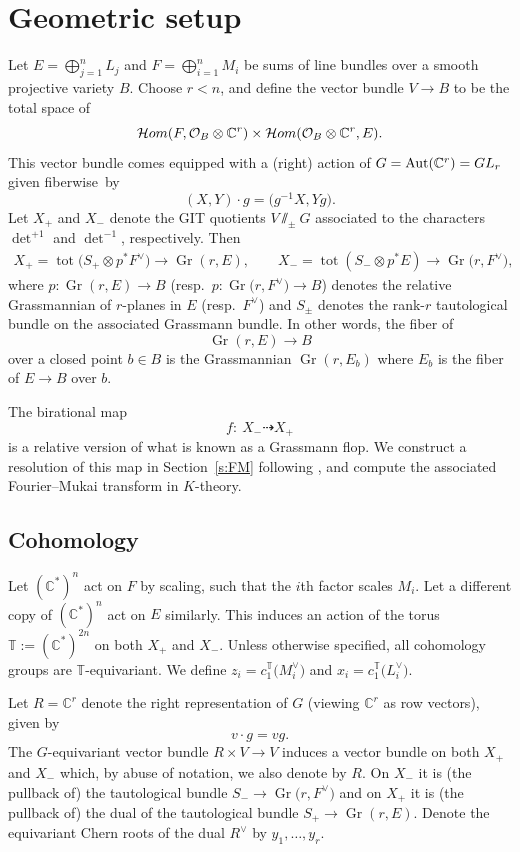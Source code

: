\documentclass[11pt]{article}
\numberwithin{equation}{section}
\numberwithin{equation}{section}
\newcommand{\cc}[1]{\mathcal{#1}} %
\newcommand{\CC}{\mathbb{C}}
\newcommand{\torus}{\mathbb{T}}
\DeclareMathOperator{\tot}{tot}
\DeclareMathOperator{\Gr}{Gr}
\newcommand{\op}[1]{\operatorname{#1}}
\newcommand{\F}{F}
\newcommand{\E}{E}
\newcommand{\MB}{M}
\newcommand{\LB}{L}
\newcommand{\z}{z}
\newcommand{\x}{x}
\newcommand{\y}{y}
\begin{document}
\section{Geometric setup}\label{gs}
Let $\E = \bigoplus_{j=1}^n \LB_j$ and $\F = \bigoplus_{i=1}^n \MB_i$ be sums of line bundles over a smooth projective variety $B$. Choose $r < n$, and define the vector bundle $V \to B$ to be the total space of
\[
\mathcal{H}{\rm om}(\F, \cc O_B \otimes \CC^r) \times \mathcal{H}{\rm om}(\cc O_B \otimes \CC^r, \E).
\]
This vector bundle comes equipped with a (right) action of $G = \op{Aut}(\CC^r) = {\rm GL}_r$ given fiberwise~by
\[
(X, Y)\cdot g = \bigl( g^{-1}X, Yg\bigr).
\]
Let $X_+$ and $X_-$ denote the GIT quotients $V\sslash_\pm G$ associated to the characters $\det^{+1}$ and $\det^{-1}$, respectively. Then
\begin{align*}
X_+ = \tot\bigl(S_+ \otimes p^*\F^\vee\bigr) \to \Gr(r, \E) ,\qquad
X_- =\tot(S_- \otimes p^*\E) \to \Gr\bigl(r, \F^\vee\bigr),
\end{align*}
where $p\colon \Gr(r, \E) \to B $ \big(resp.\ $p\colon \Gr\bigl(r, \F^\vee\bigr) \to B$\big) denotes the relative Grassmannian of $r$-planes in $\E$ \big(resp.\ $\F^\vee$\big) and $S_\pm$ denotes the rank-$r$ tautological bundle on the associated Grassmann bundle. In other words, the fiber of
\[
\Gr(r, \E) \to B
\]
over a closed point $b \in B$ is the Grassmannian $\Gr(r, \E_b)$ where $\E_b$ is the fiber of $\E \to B$ over $b$.



The birational map
\[
f\colon \ X_{-}\dashrightarrow X_{+}
\]
is a relative version of what is known as a Grassmann flop. We construct a resolution of this map in Section~\ref{s:FM} following \cite{BLV}, and compute the associated Fourier--Mukai transform in $K$-theory.

\subsection{Cohomology}\label{s:coh}
Let $(\CC^*)^n$ act on $\F$ by scaling, such that the $i$th factor scales $\MB_i$. Let a different copy of $(\CC^*)^n$ act on $\E$ similarly.
This induces an action of the torus $\torus:= (\CC^*)^{2n}$ on both $X_+$ and $X_-$. Unless otherwise specified, all cohomology groups are $\torus$-equivariant. We define $\z_i = c_1^\torus\bigl(\MB_i^\vee\bigr)$ and $\x_i = c_1^\torus\bigl(\LB_i^\vee\bigr)$.

Let $R = \CC^r$ denote the right representation of $G$ (viewing $\CC^r$ as row vectors), given by
\begin{equation} \label{e:srep}
v\cdot g = vg
.\end{equation}
The $G$-equivariant vector bundle $R \times V \to V$ induces a vector bundle on both $X_+$ and $X_-$ which, by abuse of notation, we also denote by $R$. On $X_-$ it is (the pullback of) the tautological bundle $S_- \to \Gr\bigl(r, \F^\vee\bigr)$ and on $X_+$ it is (the pullback of) the dual of the tautological bundle $S_+ \to \Gr(r, \E)$. Denote the equivariant Chern roots of the dual $R^\vee$ by $\y_1, \dots , \y_r$.
\end{document}
